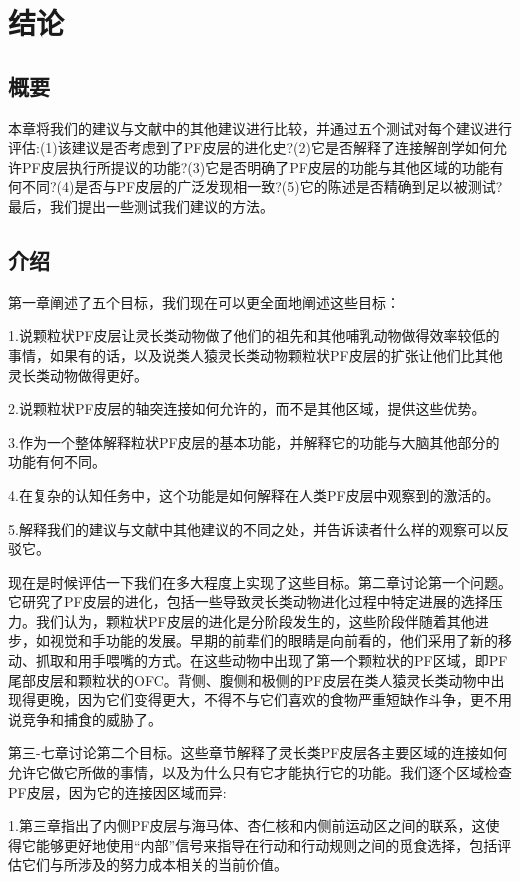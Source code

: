 \chapter{结论} \label{chap:chap10}

\section{概要}
本章将我们的建议与文献中的其他建议进行比较，并通过五个测试对每个建议进行评估:(1)该建议是否考虑到了PF皮层的进化史?(2)它是否解释了连接解剖学如何允许PF皮层执行所提议的功能?(3)它是否明确了PF皮层的功能与其他区域的功能有何不同?(4)是否与PF皮层的广泛发现相一致?(5)它的陈述是否精确到足以被测试?最后，我们提出一些测试我们建议的方法。
\section{介绍}
第一章阐述了五个目标，我们现在可以更全面地阐述这些目标：
\par
1.说颗粒状PF皮层让灵长类动物做了他们的祖先和其他哺乳动物做得效率较低的事情，如果有的话，以及说类人猿灵长类动物颗粒状PF皮层的扩张让他们比其他灵长类动物做得更好。
\par
2.说颗粒状PF皮层的轴突连接如何允许的，而不是其他区域，提供这些优势。
\par
3.作为一个整体解释粒状PF皮层的基本功能，并解释它的功能与大脑其他部分的功能有何不同。
\par 
4.在复杂的认知任务中，这个功能是如何解释在人类PF皮层中观察到的激活的。
\par 
5.解释我们的建议与文献中其他建议的不同之处，并告诉读者什么样的观察可以反驳它。
\par 
现在是时候评估一下我们在多大程度上实现了这些目标。第二章讨论第一个问题。它研究了PF皮层的进化，包括一些导致灵长类动物进化过程中特定进展的选择压力。我们认为，颗粒状PF皮层的进化是分阶段发生的，这些阶段伴随着其他进步，如视觉和手功能的发展。早期的前辈们的眼睛是向前看的，他们采用了新的移动、抓取和用手喂嘴的方式。在这些动物中出现了第一个颗粒状的PF区域，即PF尾部皮层和颗粒状的OFC。背侧、腹侧和极侧的PF皮层在类人猿灵长类动物中出现得更晚，因为它们变得更大，不得不与它们喜欢的食物严重短缺作斗争，更不用说竞争和捕食的威胁了。
\par 
第三-七章讨论第二个目标。这些章节解释了灵长类PF皮层各主要区域的连接如何允许它做它所做的事情，以及为什么只有它才能执行它的功能。我们逐个区域检查PF皮层，因为它的连接因区域而异:
\par 
1.第三章指出了内侧PF皮层与海马体、杏仁核和内侧前运动区之间的联系，这使得它能够更好地使用“内部”信号来指导在行动和行动规则之间的觅食选择，包括评估它们与所涉及的努力成本相关的当前价值。
